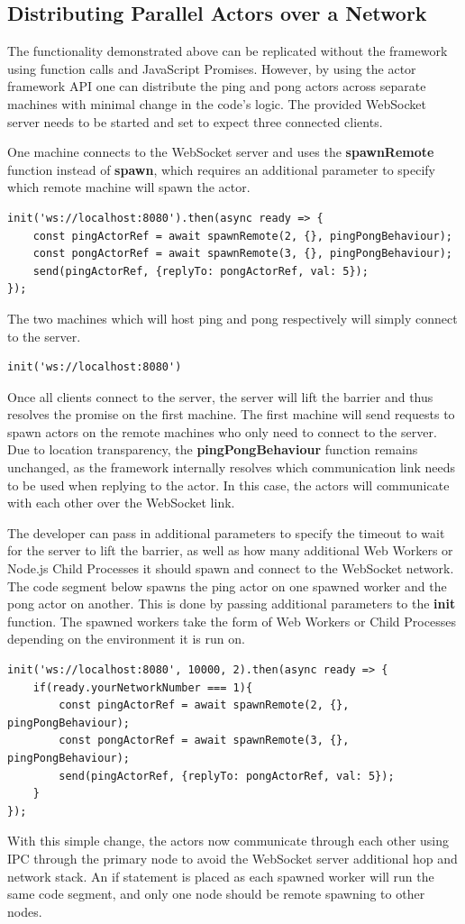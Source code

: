 \documentclass[oneside]{um-fict}
\begin{document}
\subsection{Distributing Parallel Actors over a Network}
The functionality demonstrated above can be replicated without the framework using function calls and JavaScript Promises. However, by using the actor framework API one can distribute the ping and pong actors across separate machines with minimal change in the code's logic. The provided WebSocket server needs to be started and set to expect three connected clients. 

One machine connects to the WebSocket server and uses the \textbf{spawnRemote} function instead of \textbf{spawn}, which requires an additional parameter to specify which remote machine will spawn the actor.
\begin{lstlisting}
init('ws://localhost:8080').then(async ready => {
    const pingActorRef = await spawnRemote(2, {}, pingPongBehaviour);
    const pongActorRef = await spawnRemote(3, {}, pingPongBehaviour);
    send(pingActorRef, {replyTo: pongActorRef, val: 5});
});
\end{lstlisting}

The two machines which will host ping and pong respectively will simply connect to the server.
\begin{lstlisting}
init('ws://localhost:8080')
\end{lstlisting}

Once all clients connect to the server, the server will lift the barrier and thus resolves the promise on the first machine. The first machine will send requests to spawn actors on the remote machines who only need to connect to the server. Due to location transparency, the \textbf{pingPongBehaviour} function remains unchanged, as the framework internally resolves which communication link needs to be used when replying to the actor. In this case, the actors will communicate with each other over the WebSocket link.

The developer can pass in additional parameters to specify the timeout to wait for the server to lift the barrier, as well as how many additional Web Workers or Node.js Child Processes it should spawn and connect to the WebSocket network. The code segment below spawns the ping actor on one spawned worker and the pong actor on another. This is done by passing additional parameters to the \textbf{init} function. The spawned workers take the form of Web Workers or Child Processes depending on the environment it is run on.
\begin{lstlisting}
init('ws://localhost:8080', 10000, 2).then(async ready => {
    if(ready.yourNetworkNumber === 1){
        const pingActorRef = await spawnRemote(2, {}, pingPongBehaviour);
        const pongActorRef = await spawnRemote(3, {}, pingPongBehaviour);
        send(pingActorRef, {replyTo: pongActorRef, val: 5});
    }
});
\end{lstlisting}
With this simple change, the actors now communicate through each other using IPC through the primary node to avoid the WebSocket server additional hop and network stack. An if statement is placed as each spawned worker will run the same code segment, and only one node should be remote spawning to other nodes.
\end{document}
